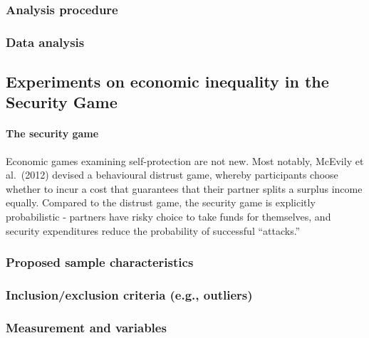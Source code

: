 \documentclass[
  english,
  man]{apa6}
\let\oldparagraph\paragraph
\renewcommand{\paragraph}[1]{\oldparagraph{#1}\mbox{}}
\begin{document}
\hypertarget{analysis-procedure}{%
\subsubsection{Analysis procedure}\label{analysis-procedure}}

\hypertarget{data-analysis}{%
\subsubsection{Data analysis}\label{data-analysis}}

\hypertarget{experiments-on-economic-inequality-in-the-security-game}{%
\subsection{Experiments on economic inequality in the Security Game}\label{experiments-on-economic-inequality-in-the-security-game}}

\hypertarget{the-security-game}{%
\paragraph{The security game}\label{the-security-game}}

Economic games examining self-protection are not new. Most notably, McEvily et al.~(2012) devised a behavioural distrust game, whereby participants choose whether to incur a cost that guarantees that their partner splits a surplus income equally. Compared to the distrust game, the security game is explicitly probabilistic - partners have risky choice to take funds for themselves, and security expenditures reduce the probability of successful ``attacks.''

\hypertarget{proposed-sample-characteristics-1}{%
\subsubsection{Proposed sample characteristics}\label{proposed-sample-characteristics-1}}

\hypertarget{inclusionexclusion-criteria-e.g.-outliers-1}{%
\subsubsection{Inclusion/exclusion criteria (e.g., outliers)}\label{inclusionexclusion-criteria-e.g.-outliers-1}}

\hypertarget{measurement-and-variables-1}{%
\subsubsection{Measurement and variables}\label{measurement-and-variables-1}}
\end{document}
